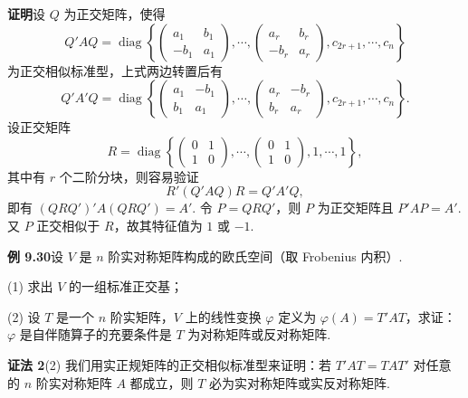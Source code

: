 \documentclass[UTF8,12pt,a4paper,fontset=fandol]{ctexart}
\begin{document}
\noindent\textbf{证明}\quad 设 $Q$ 为正交矩阵，使得
\[
Q'AQ=\operatorname{diag}\left\{
\begin{pmatrix}
a_1&b_1\\
-b_1&a_1
\end{pmatrix},\cdots,
\begin{pmatrix}
a_r&b_r\\
-b_r&a_r
\end{pmatrix},
c_{2r+1},\cdots,c_n
\right\}
\]
为正交相似标准型，上式两边转置后有
\[
Q'A'Q=\operatorname{diag}\left\{
\begin{pmatrix}
a_1&-b_1\\
b_1&a_1
\end{pmatrix},\cdots,
\begin{pmatrix}
a_r&-b_r\\
b_r&a_r
\end{pmatrix},
c_{2r+1},\cdots,c_n
\right\}.
\]
设正交矩阵
\[
R=\operatorname{diag}\left\{
\begin{pmatrix}
0&1\\
1&0
\end{pmatrix},\cdots,
\begin{pmatrix}
0&1\\
1&0
\end{pmatrix},
1,\cdots,1
\right\},
\]
其中有 $r$ 个二阶分块，则容易验证
\[
R'(Q'AQ)R=Q'A'Q,
\]
即有 $(QRQ')'A(QRQ')=A'$. 令 $P=QRQ'$，则 $P$ 为正交矩阵且 $P'AP=A'$. 又 $P$ 正交相似于 $R$，故其特征值为 $1$ 或 $-1$.

\noindent\textbf{例 9.30}\quad 设 $V$ 是 $n$ 阶实对称矩阵构成的欧氏空间（取 Frobenius 内积）.

(1) 求出 $V$ 的一组标准正交基；

(2) 设 $T$ 是一个 $n$ 阶实矩阵，$V$ 上的线性变换 $\varphi$ 定义为 $\varphi(A)=T'AT$，求证：$\varphi$ 是自伴随算子的充要条件是 $T$ 为对称矩阵或反对称矩阵.

\noindent\textbf{证法 2}\quad (2) 我们用实正规矩阵的正交相似标准型来证明：若 $T'AT=TA T'$ 对任意的 $n$ 阶实对称矩阵 $A$ 都成立，则 $T$ 必为实对称矩阵或实反对称矩阵.
\end{document}

